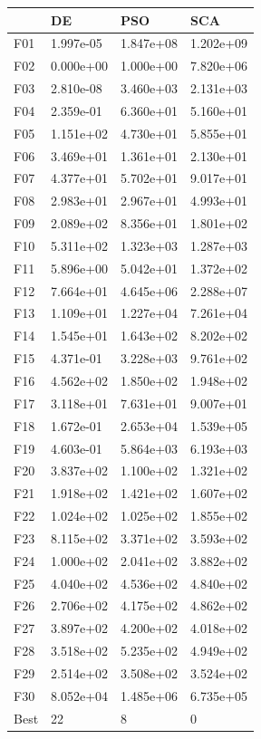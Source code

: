 \begin{tabular}{llll}
\toprule
{} &         DE &        PSO &        SCA \\
\midrule
F01  &  1.997e-05 &  1.847e+08 &  1.202e+09 \\
F02  &  0.000e+00 &  1.000e+00 &  7.820e+06 \\
F03  &  2.810e-08 &  3.460e+03 &  2.131e+03 \\
F04  &  2.359e-01 &  6.360e+01 &  5.160e+01 \\
F05  &  1.151e+02 &  4.730e+01 &  5.855e+01 \\
F06  &  3.469e+01 &  1.361e+01 &  2.130e+01 \\
F07  &  4.377e+01 &  5.702e+01 &  9.017e+01 \\
F08  &  2.983e+01 &  2.967e+01 &  4.993e+01 \\
F09  &  2.089e+02 &  8.356e+01 &  1.801e+02 \\
F10  &  5.311e+02 &  1.323e+03 &  1.287e+03 \\
F11  &  5.896e+00 &  5.042e+01 &  1.372e+02 \\
F12  &  7.664e+01 &  4.645e+06 &  2.288e+07 \\
F13  &  1.109e+01 &  1.227e+04 &  7.261e+04 \\
F14  &  1.545e+01 &  1.643e+02 &  8.202e+02 \\
F15  &  4.371e-01 &  3.228e+03 &  9.761e+02 \\
F16  &  4.562e+02 &  1.850e+02 &  1.948e+02 \\
F17  &  3.118e+01 &  7.631e+01 &  9.007e+01 \\
F18  &  1.672e-01 &  2.653e+04 &  1.539e+05 \\
F19  &  4.603e-01 &  5.864e+03 &  6.193e+03 \\
F20  &  3.837e+02 &  1.100e+02 &  1.321e+02 \\
F21  &  1.918e+02 &  1.421e+02 &  1.607e+02 \\
F22  &  1.024e+02 &  1.025e+02 &  1.855e+02 \\
F23  &  8.115e+02 &  3.371e+02 &  3.593e+02 \\
F24  &  1.000e+02 &  2.041e+02 &  3.882e+02 \\
F25  &  4.040e+02 &  4.536e+02 &  4.840e+02 \\
F26  &  2.706e+02 &  4.175e+02 &  4.862e+02 \\
F27  &  3.897e+02 &  4.200e+02 &  4.018e+02 \\
F28  &  3.518e+02 &  5.235e+02 &  4.949e+02 \\
F29  &  2.514e+02 &  3.508e+02 &  3.524e+02 \\
F30  &  8.052e+04 &  1.485e+06 &  6.735e+05 \\
Best &         22 &          8 &          0 \\
\bottomrule
\end{tabular}

